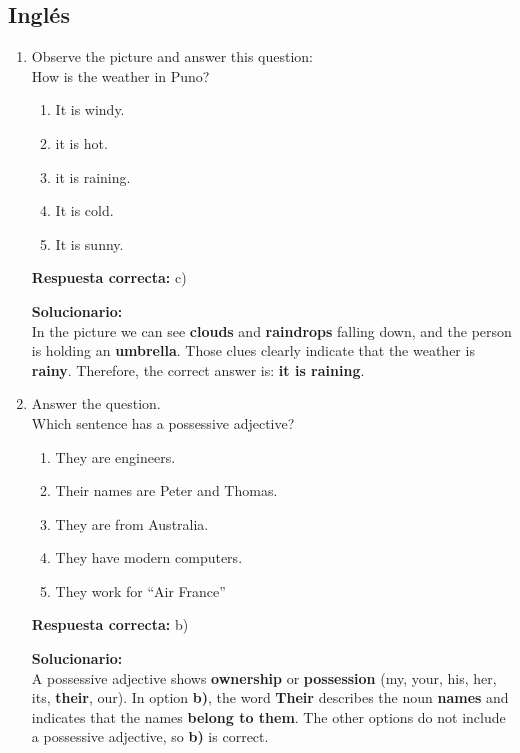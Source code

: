 


\subsection*{Inglés}

\begin{enumerate}
	
\item Observe the picture and answer this question:\\
How is the weather in Puno?
\begin{enumerate}[label=\alph*)]
	\item It is windy.
	\item it is hot.
	\item it is raining.
	\item It is cold.
	\item It is sunny.
\end{enumerate}

\textbf{Respuesta correcta:} c)

\vspace{2mm}
\textbf{Solucionario:}\\
In the picture we can see \textbf{clouds} and \textbf{raindrops} falling down, and the person is holding an \textbf{umbrella}. Those clues clearly indicate that the weather is \textbf{rainy}. Therefore, the correct answer is: \textbf{it is raining}.


\item Answer the question.\\
Which sentence has a possessive adjective?
\begin{enumerate}[label=\alph*)]
	\item They are engineers.
	\item Their names are Peter and Thomas.
	\item They are from Australia.
	\item They have modern computers.
	\item They work for ``Air France''
\end{enumerate}

\textbf{Respuesta correcta:} b)

\vspace{2mm}
\textbf{Solucionario:}\\
A possessive adjective shows \textbf{ownership} or \textbf{possession} (my, your, his, her, its, \textbf{their}, our). 
In option \textbf{b)}, the word \textbf{Their} describes the noun \textbf{names} and indicates that the names \textbf{belong to them}. The other options do not include a possessive adjective, so \textbf{b)} is correct.

\end{enumerate}



